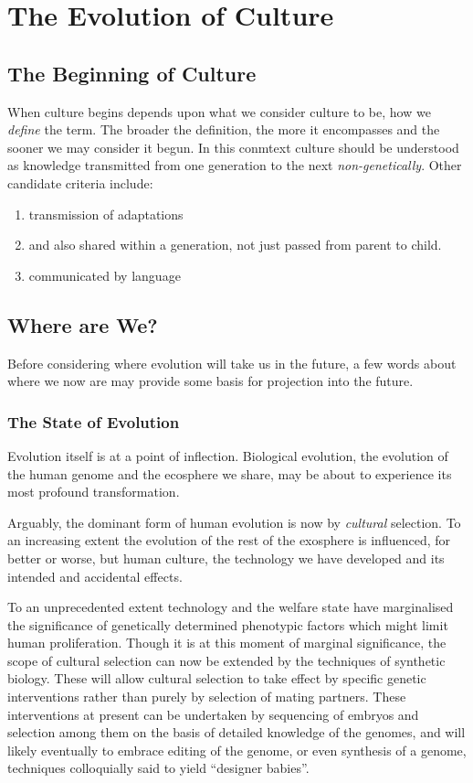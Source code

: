 \documentclass[10pt,titlepage]{book}
\begin{document}
\part{The Evolution of Culture}

\chapter{The Beginning of Culture}

When culture begins depends upon what we consider culture to be, how we \emph{define} the term.
The broader the definition, the more it encompasses and the sooner we may consider it begun.
In this conmtext culture should be understood as knowledge transmitted from one generation to the next \emph{non-genetically}.
Other candidate criteria include:

\begin{enumerate}
  \item transmission of adaptations
  \item and also shared within a generation, not just passed from parent to child.
  \item communicated by language
\end{enumerate}



\chapter{Where are We?}

Before considering where evolution will take us in the future, a few words about where we now are may provide some basis for projection into the future.

\section{The State of Evolution}

Evolution itself is at a point of inflection.
Biological evolution, the evolution of the human genome and the ecosphere we share, may be about to experience its most profound transformation.

Arguably, the dominant form of human evolution is now by \emph{cultural} selection.
To an increasing extent the evolution of the rest of the exosphere is influenced, for better or worse, but human culture, the technology we have developed and its intended and accidental effects.

To an unprecedented extent technology and the welfare state have marginalised the significance of genetically determined phenotypic factors which might limit human proliferation.
Though it is at this moment of marginal significance, the scope of cultural selection can now be extended by the techniques of synthetic biology.
These will allow cultural selection to take effect by specific genetic interventions rather than purely by selection of mating partners.
These interventions at present can be undertaken by sequencing of embryos and selection among them on the basis of detailed knowledge of the genomes, and will likely eventually to embrace editing of the genome, or even synthesis of a genome, techniques colloquially said to yield ``designer babies''.
\end{document}
